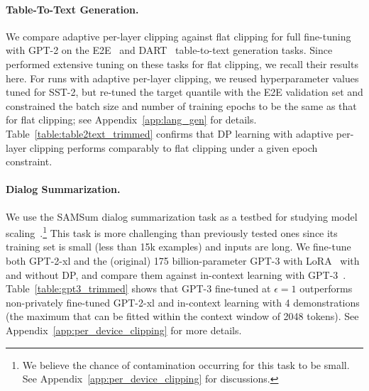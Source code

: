 \paragraph{Table-To-Text Generation.}
We compare adaptive per-layer clipping against flat clipping for full fine-tuning with GPT-2 on the E2E~\citep{novikova2017e2e} and DART~\citep{nan2020dart} table-to-text generation tasks. 
Since~\cite{li2022large} performed extensive tuning on these tasks for flat clipping, we recall their results here.
For runs with adaptive per-layer clipping, we reused hyperparameter values tuned for SST-2, but re-tuned the target quantile with the E2E validation set and constrained the batch size and number of training epochs to be the same as that for flat clipping; see Appendix~\ref{app:lang_gen} for details.
Table~\ref{table:table2text_trimmed} confirms that DP learning with adaptive per-layer clipping performs comparably to flat clipping under a given epoch constraint.

\paragraph{Dialog Summarization.}\label{exp:summarization}
We use the SAMSum dialog summarization task as a testbed for studying model scaling~\citep{gliwa2019samsum}.\footnote{We believe the chance of contamination occurring for this task to be small. See Appendix~\ref{app:per_device_clipping} for discussions.}
This task is more challenging than previously tested ones since its training set is small (less than 15k examples) and inputs are long. 
We fine-tune both GPT-2-xl and the (original) 175 billion-parameter GPT-3 with LoRA~\citep{hu2021lora} with and without DP, and compare them against in-context learning with GPT-3~\citep{brown2020language}.
Table~\ref{table:gpt3_trimmed} shows that GPT-3 fine-tuned at $\epsilon=1$ outperforms non-privately fine-tuned GPT-2-xl and in-context learning with 4 demonstrations (the maximum that can be fitted within the context window of 2048 tokens). 
See Appendix~\ref{app:per_device_clipping} for more details.
